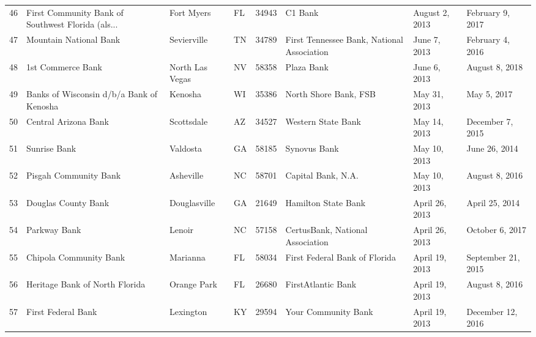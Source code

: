 \begin{tabular}{llllrlll}
46  &  First Community Bank of Southwest Florida (als... &          Fort Myers &  FL &  34943 &                                            C1 Bank &      August 2, 2013 &    February 9, 2017 \\
47  &                             Mountain National Bank &         Sevierville &  TN &  34789 &         First Tennessee Bank, National Association &        June 7, 2013 &    February 4, 2016 \\
48  &                                  1st Commerce Bank &     North Las Vegas &  NV &  58358 &                                         Plaza Bank &        June 6, 2013 &      August 8, 2018 \\
49  &           Banks of Wisconsin d/b/a Bank of Kenosha &             Kenosha &  WI &  35386 &                              North Shore Bank, FSB &        May 31, 2013 &         May 5, 2017 \\
50  &                               Central Arizona Bank &          Scottsdale &  AZ &  34527 &                                 Western State Bank &        May 14, 2013 &    December 7, 2015 \\
51  &                                       Sunrise Bank &            Valdosta &  GA &  58185 &                                       Synovus Bank &        May 10, 2013 &       June 26, 2014 \\
52  &                              Pisgah Community Bank &           Asheville &  NC &  58701 &                                 Capital Bank, N.A. &        May 10, 2013 &      August 8, 2016 \\
53  &                                Douglas County Bank &        Douglasville &  GA &  21649 &                                Hamilton State Bank &      April 26, 2013 &      April 25, 2014 \\
54  &                                       Parkway Bank &              Lenoir &  NC &  57158 &                   CertusBank, National Association &      April 26, 2013 &     October 6, 2017 \\
55  &                             Chipola Community Bank &            Marianna &  FL &  58034 &                      First Federal Bank of Florida &      April 19, 2013 &  September 21, 2015 \\
56  &                     Heritage Bank of North Florida &         Orange Park &  FL &  26680 &                                 FirstAtlantic Bank &      April 19, 2013 &      August 8, 2016 \\
57  &                                 First Federal Bank &           Lexington &  KY &  29594 &                                Your Community Bank &      April 19, 2013 &   December 12, 2016 \\

\end{tabular}
